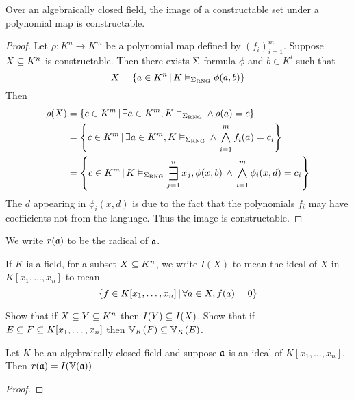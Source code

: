 \begin{prop}[Chevalley]
    Over an algebraically closed field, 
    the image of a constructable set under a polynomial map is constructable.
\end{prop}
\begin{proof}
    Let $\rho : K^n \to K^m$ be a polynomial map defined by $(f_i)_{i=1}^m$. 
    Suppose $X \subseteq K^n$ is constructable.
    Then  
    there exists $\Sigma$-formula $\phi$ and $b \in K^l$ such that 
    \[X = \left\{a \in K^n \,|\, K \vDash_{\Sigma_{\mathrm{RNG}}} \phi(a,b)\right\}\]
    Then 
    \begin{align*}
        \rho(X) &= \set{c \in K^m \st \exists a \in K^m, K \model{\Si_\RNG}
        \AND \rho(a) = c}\\
        &= \set{c \in K^m \st \exists a \in K^m, K \model{\Si_\RNG}
            \AND \bigand{i = 1}{m} f_i(a) = c_i}\\
        &= \set{c \in K^m \st K \model{\Si_\RNG} \bigexists{j = 1}{n} x_j,
            \phi(x,b) \AND \bigand{i=1}{m} \phi_i(x,d) = c_i}
    \end{align*}
    The $d$ appearing in $\phi_i(x,d)$ is due to the fact that the polynomials 
    $f_i$ may have coefficients not from the language.
    Thus the image is constructable.
\end{proof}

\begin{nttn}[Radical]
    We write $r(\mathfrak{a})$ to be the radical of $\mathfrak{a}$.
\end{nttn}

\begin{dfn}
    If $K$ is a field, for a subset $X \subseteq K^n$, 
    we write $I(X)$ to mean the ideal of $X$ in $K[x_1,\dots,x_n]$ to mean
    \[\left\{f \in K[x_1,\dots, x_n] \,|\, \forall a \in X, f(a) = 0\right\}\]
\end{dfn}

\begin{ex}
    Show that if $X \subseteq Y \subseteq K^n$ then $I(Y) \subseteq I(X)$.
    Show that if $E \subseteq F \subseteq K[x_1,\dots,x_n]$ then 
    $\mathbb{V}_K(F) \subseteq \mathbb{V}_K(E)$.
\end{ex}

\begin{prop}
    Let $K$ be an algebraically closed field and suppose 
    $\mathfrak{a}$ is an ideal of $K[x_1,\dots,x_n]$.
    Then $r(\mathfrak{a}) = I(\mathbb{V}(\mathfrak{a}))$.
\end{prop}
\begin{proof}
\end{proof}

